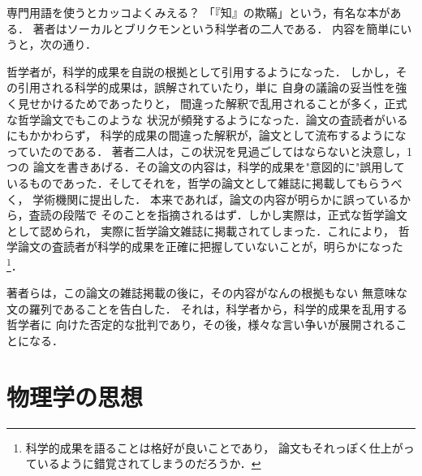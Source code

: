                 \begin{memo}{専門用語を使うとカッコよくみえる？}
                    「『知』の欺瞞」という，有名な本がある．
                    著者はソーカルとブリクモンという科学者の二人である．
                    内容を簡単にいうと，次の通り．

                    哲学者が，科学的成果を自説の根拠として引用するようになった．
                    しかし，その引用される科学的成果は，誤解されていたり，単に
                    自身の議論の妥当性を強く見せかけるためであったりと，
                    間違った解釈で乱用されることが多く，正式な哲学論文でもこのような
                    状況が頻発するようになった．論文の査読者がいるにもかかわらず，
                    科学的成果の間違った解釈が，論文として流布するようになっていたのである．
                    著者二人は，この状況を見過ごしてはならないと決意し，1つの
                    論文を書きあげる．その論文の内容は，科学的成果を"意図的に"誤用して
                    いるものであった．そしてそれを，哲学の論文として雑誌に掲載してもらうべく，
                    学術機関に提出した．
                    本来であれば，論文の内容が明らかに誤っているから，査読の段階で
                    そのことを指摘されるはず．しかし実際は，正式な哲学論文として認められ，
                    実際に哲学論文雑誌に掲載されてしまった．これにより，
                    哲学論文の査読者が科学的成果を正確に把握していないことが，明らかになった
                        \footnote{
                            科学的成果を語ることは格好が良いことであり，
                            論文もそれっぽく仕上がっているように錯覚されてしまうのだろうか．
                        }．

                    著者らは，この論文の雑誌掲載の後に，その内容がなんの根拠もない
                    無意味な文の羅列であることを告白した．
                    それは，科学者から，科学的成果を乱用する哲学者に
                    向けた否定的な批判であり，その後，様々な言い争いが展開されることになる．
                \end{memo}

    \section{物理学の思想}
